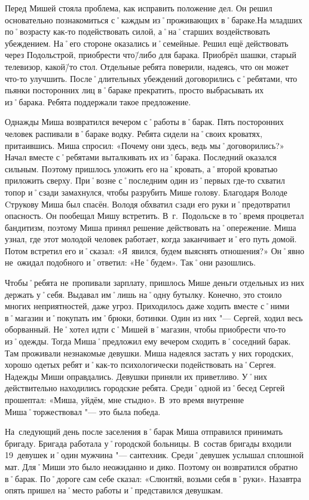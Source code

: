 Перед Мишей стояла проблема, как исправить положение дел. Он решил основательно познакомиться с˚каждым из˚проживающих в˚бараке.На младших по˚возрасту как-то подействовать силой, а˚на˚старших воздействовать убеждением. На˚его стороне оказались и˚семейные. Решил ещё действовать через Подольстрой, приобрести что\=/либо для барака. Приобрёл шашки, старый телевизор, какой\=/то стол. Отдельные ребята поверили, надеясь, что он может что-то улучшить. После˚длительных убеждений договорились с˚ребятами, что пьянки посторонних лиц в˚бараке прекратить, просто выбрасывать их из˚барака. Ребята поддержали такое предложение.

Однажды Миша возвратился вечером с˚работы в˚барак. Пять посторонних человек распивали в˚бараке водку. Ребята сидели на˚своих кроватях, притаившись. Миша спросил: «Почему они здесь, ведь мы˚договорились?» Начал вместе с˚ребятами выталкивать их из˚барака. Последний оказался сильным. Поэтому пришлось уложить его на˚кровать, а˚второй кроватью приложить сверху. При˚возне с˚последним один из˚первых где-то схватил топор и˚сзади замахнулся, чтобы разрубить Мише голову. Благодаря Володе Cтрукову Миша был спасён. Володя обхватил сзади его руки и˚предотвратил опасность. Он пообещал Мишу встретить. В~г.~Подольске в то˚время процветал бандитизм, поэтому Миша принял решение действовать на˚опережение. Миша узнал, где этот молодой человек работает, когда заканчивает и˚его путь домой. Потом встретил его и˚сказал: «Я~явился, будем выяснять отношения?» Он˚явно не~ожидал подобного и˚ответил: «Не˚будем». Так˚они разошлись.

Чтобы˚ребята не~пропивали зарплату, пришлось Мише деньги отдельных из них держать у˚себя. Выдавал им˚лишь на˚одну бутылку. Конечно, это стоило многих неприятностей, даже угроз. Приходилось даже ходить вместе с˚ними в˚магазин и˚покупать им˚брюки, ботинки. Один из них "--- Сергей, ходил весь оборванный. Не˚хотел идти с˚Мишей в˚магазин, чтобы приобрести что-то из˚одежды. Тогда Миша˚предложил ему вечером сходить в˚соседний барак. Там проживали незнакомые девушки. Миша надеялся застать у них городских, хорошо одетых ребят и˚как-то психологически подействовать на˚Сергея. Надежды Миши оправдались. Девушки приняли их приветливо. У˚них действительно находились городские ребята. Среди˚одной из˚бесед Сергей прошептал: «Миша, уйдём, мне стыдно». В~это время внутренне Миша˚торжествовал "--- это была победа.

На~следующий день после заселения в˚барак Миша отправился принимать бригаду. Бригада работала у˚городской больницы. В~состав бригады входили 19~девушек и˚один мужчина "--- сантехник. Среди˚девушек услышал сплошной мат. Для˚Миши это было неожиданно и дико. Поэтому он возвратился обратно в˚барак. По˚дороге сам себе сказал: «Слюнтяй, возьми себя в˚руки». Назавтра опять пришел на˚место работы и˚представился девушкам.


